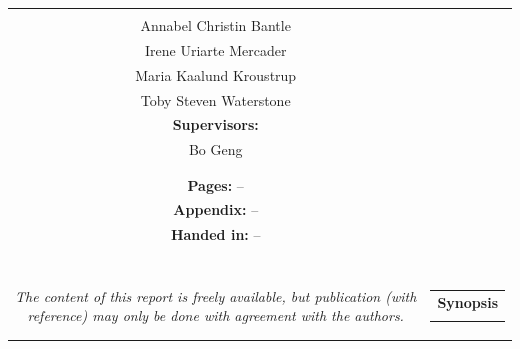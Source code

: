 \begin{titlepage}
\begin{nopagebreak}
{\begin{tabular}{cc}
{{\textbf{Participants:}\\
Annabel Christin Bantle \\
Irene Uriarte Mercader \\
Maria Kaalund Kroustrup \\
Toby Steven Waterstone \\


\textbf{Supervisors:}\\
Bo Geng

}\\
\\
\\
\textbf{Pages:} --\\
\textbf{Appendix:} -- \\
\textbf{Handed in:} --\\
\\
\\
\\
\\
\\
\textit{The content of this report is freely available, but publication (with reference) may only be done with
	agreement with the authors.}
\vfill } &
\parbox{7cm}{
  \vspace{.15cm}
  \hfill
  \begin{tabular}{l}
  {\textbf{Synopsis}}\bigskip \\
  \fbox{
    \parbox{7cm}{\bigskip
     {\vfill{\small 
     \bigskip}}
     }}
   \end{tabular}}
\end{tabular}} %


\end{nopagebreak}
\end{titlepage}
%